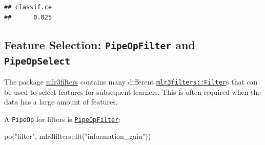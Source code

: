 \documentclass[
]{scrbook}
\newenvironment{Shaded}{\begin{snugshade}}{\end{snugshade}}
\newcommand{\DecValTok}[1]{\textcolor[rgb]{0.00,0.00,0.81}{#1}}
\newcommand{\FunctionTok}[1]{\textcolor[rgb]{0.00,0.00,0.00}{#1}}
\newcommand{\NormalTok}[1]{#1}
\newcommand{\OtherTok}[1]{\textcolor[rgb]{0.56,0.35,0.01}{#1}}
\newcommand{\SpecialCharTok}[1]{\textcolor[rgb]{0.00,0.00,0.00}{#1}}
\newcommand{\StringTok}[1]{\textcolor[rgb]{0.31,0.60,0.02}{#1}}
\renewenvironment{Shaded} {\begin{snugshade}\small} {\end{snugshade}}
\begin{document}
\begin{Shaded}
\end{Shaded}

\begin{verbatim}
## classif.ce 
##      0.025
\end{verbatim}

\hypertarget{feature-selection-pipeopfilter-and-pipeopselect}{%
\subsection{\texorpdfstring{Feature Selection: \texttt{PipeOpFilter} and \texttt{PipeOpSelect}}{Feature Selection: PipeOpFilter and PipeOpSelect}}\label{feature-selection-pipeopfilter-and-pipeopselect}}

The package \href{https://mlr3filters.mlr-org.com}{mlr3filters} contains many different \href{https://mlr3filters.mlr-org.com/reference/Filter.html}{\texttt{mlr3filters::Filter}}s that can be used to select features for subsequent learners.
This is often required when the data has a large amount of features.

A \texttt{PipeOp} for filters is \href{https://mlr3pipelines.mlr-org.com/reference/mlr_pipeops_filter.html}{\texttt{PipeOpFilter}}:

\begin{Shaded}
\begin{Highlighting}[]
\FunctionTok{po}\NormalTok{(}\StringTok{"filter"}\NormalTok{, mlr3filters}\SpecialCharTok{::}\FunctionTok{flt}\NormalTok{(}\StringTok{"information\_gain"}\NormalTok{))}
\end{Highlighting}
\end{Shaded}
\end{document}
